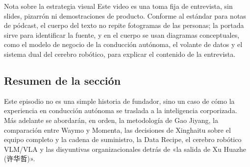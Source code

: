 \begin{knowledgebox}{Nota sobre la estrategia visual}
Este video es una toma fija de entrevista, sin slides, pizarrón ni demostraciones de producto. Conforme al estándar para notas de pódcast, el cuerpo del texto no repite fotogramas de las personas; la portada sirve para identificar la fuente, y en el cuerpo se usan diagramas conceptuales, como el modelo de negocio de la conducción autónoma, el volante de datos y el sistema dual del cerebro robótico, para explicar el contenido de la entrevista.
\end{knowledgebox}

\subsection{Resumen de la sección}

Este episodio no es una simple historia de fundador, sino un caso de cómo la experiencia en conducción autónoma se traslada a la inteligencia corporizada. Más adelante se abordarán, en orden, la metodología de Gao Jiyang, la comparación entre Waymo y Momenta, las decisiones de Xinghaitu sobre el equipo completo y la cadena de suministro, la Data Recipe, el cerebro robótico VLM/VLA y las disyuntivas organizacionales detrás de «la salida de Xu Huazhe (许华哲)».
